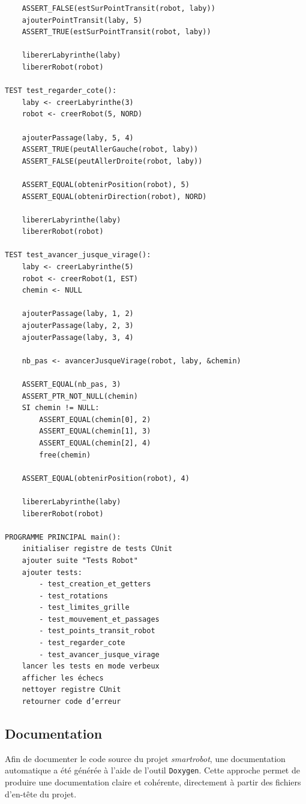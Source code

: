 \begin{verbatim}
    ASSERT_FALSE(estSurPointTransit(robot, laby))
    ajouterPointTransit(laby, 5)
    ASSERT_TRUE(estSurPointTransit(robot, laby))

    libererLabyrinthe(laby)
    libererRobot(robot)

TEST test_regarder_cote():
    laby <- creerLabyrinthe(3)
    robot <- creerRobot(5, NORD)

    ajouterPassage(laby, 5, 4)
    ASSERT_TRUE(peutAllerGauche(robot, laby))
    ASSERT_FALSE(peutAllerDroite(robot, laby))

    ASSERT_EQUAL(obtenirPosition(robot), 5)
    ASSERT_EQUAL(obtenirDirection(robot), NORD)

    libererLabyrinthe(laby)
    libererRobot(robot)

TEST test_avancer_jusque_virage():
    laby <- creerLabyrinthe(5)
    robot <- creerRobot(1, EST)
    chemin <- NULL

    ajouterPassage(laby, 1, 2)
    ajouterPassage(laby, 2, 3)
    ajouterPassage(laby, 3, 4)

    nb_pas <- avancerJusqueVirage(robot, laby, &chemin)

    ASSERT_EQUAL(nb_pas, 3)
    ASSERT_PTR_NOT_NULL(chemin)
    SI chemin != NULL:
        ASSERT_EQUAL(chemin[0], 2)
        ASSERT_EQUAL(chemin[1], 3)
        ASSERT_EQUAL(chemin[2], 4)
        free(chemin)

    ASSERT_EQUAL(obtenirPosition(robot), 4)

    libererLabyrinthe(laby)
    libererRobot(robot)

PROGRAMME PRINCIPAL main():
    initialiser registre de tests CUnit
    ajouter suite "Tests Robot"
    ajouter tests:
        - test_creation_et_getters
        - test_rotations
        - test_limites_grille
        - test_mouvement_et_passages
        - test_points_transit_robot
        - test_regarder_cote
        - test_avancer_jusque_virage
    lancer les tests en mode verbeux
    afficher les échecs
    nettoyer registre CUnit
    retourner code d’erreur
\end{verbatim}

\subsection{Documentation}

Afin de documenter le code source du projet \textit{smartrobot}, une documentation
automatique a été générée à l’aide de l’outil \texttt{Doxygen}.
Cette approche permet de produire une documentation claire et cohérente,
directement à partir des fichiers d’en-tête du projet.


